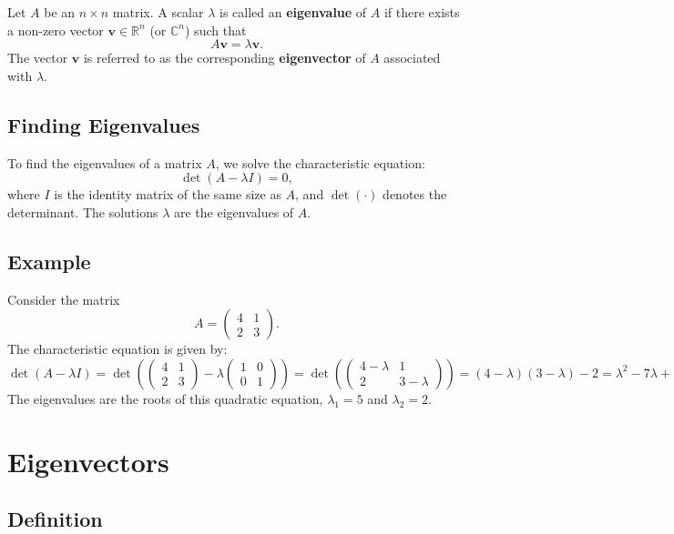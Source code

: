 \documentclass[]{article}
\begin{document}
	Let \( A \) be an \( n \times n \) matrix. A scalar \( \lambda \) is called an \textbf{eigenvalue} of \( A \) if there exists a non-zero vector \( \mathbf{v} \in \mathbb{R}^n \) (or \( \mathbb{C}^n \)) such that
	\[
	A \mathbf{v} = \lambda \mathbf{v}.
	\]
	The vector \( \mathbf{v} \) is referred to as the corresponding \textbf{eigenvector} of \( A \) associated with \( \lambda \).
	
	\subsection{Finding Eigenvalues}
	
	To find the eigenvalues of a matrix \( A \), we solve the characteristic equation:
	\[
	\det(A - \lambda I) = 0,
	\]
	where \( I \) is the identity matrix of the same size as \( A \), and \( \det(\cdot) \) denotes the determinant. The solutions \( \lambda \) are the eigenvalues of \( A \).
	
	\subsection{Example}
	
	Consider the matrix
	\[
	A = \begin{pmatrix}
		4 & 1 \\
		2 & 3
	\end{pmatrix}.
	\]
	The characteristic equation is given by:
	\[
	\det(A - \lambda I) = \det\left(\begin{pmatrix}
		4 & 1 \\
		2 & 3
	\end{pmatrix} - \lambda \begin{pmatrix}
		1 & 0 \\
		0 & 1
	\end{pmatrix}\right) = \det\left(\begin{pmatrix}
		4-\lambda & 1 \\
		2 & 3-\lambda
	\end{pmatrix}\right) = (4-\lambda)(3-\lambda) - 2 = \lambda^2 - 7\lambda + 10 = 0.
	\]
	The eigenvalues are the roots of this quadratic equation, \( \lambda_1 = 5 \) and \( \lambda_2 = 2 \).
	
	\section{Eigenvectors}
	
	\subsection{Definition}
	
\end{document}
